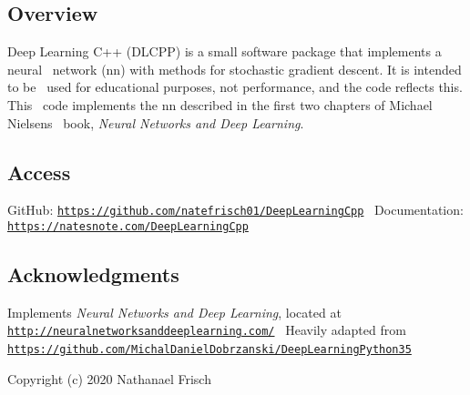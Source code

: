 \subsection*{Overview}

Deep Learning C++ (D\+L\+C\+PP) is a small software package that implements a neural~\newline
 network (nn) with methods for stochastic gradient descent. It is intended to be~\newline
 used for educational purposes, not performance, and the code reflects this. This~\newline
 code implements the nn described in the first two chapters of Michael Nielsen\textquotesingle{}s~\newline
 book, {\itshape Neural Networks and Deep Learning}.

\subsection*{Access}

Git\+Hub\+: \href{https://github.com/natefrisch01/DeepLearningCpp}{\tt https\+://github.\+com/natefrisch01/\+Deep\+Learning\+Cpp}~\newline
 Documentation\+: \href{https://natesnote.com/DeepLearningCpp}{\tt https\+://natesnote.\+com/\+Deep\+Learning\+Cpp}

\subsection*{Acknowledgments}

Implements {\itshape Neural Networks and Deep Learning}, located at~\newline
 \href{http://neuralnetworksanddeeplearning.com/}{\tt http\+://neuralnetworksanddeeplearning.\+com/}~\newline
 Heavily adapted from~\newline
 \href{https://github.com/MichalDanielDobrzanski/DeepLearningPython35}{\tt https\+://github.\+com/\+Michal\+Daniel\+Dobrzanski/\+Deep\+Learning\+Python35}~\newline


Copyright (c) 2020 Nathanael Frisch 